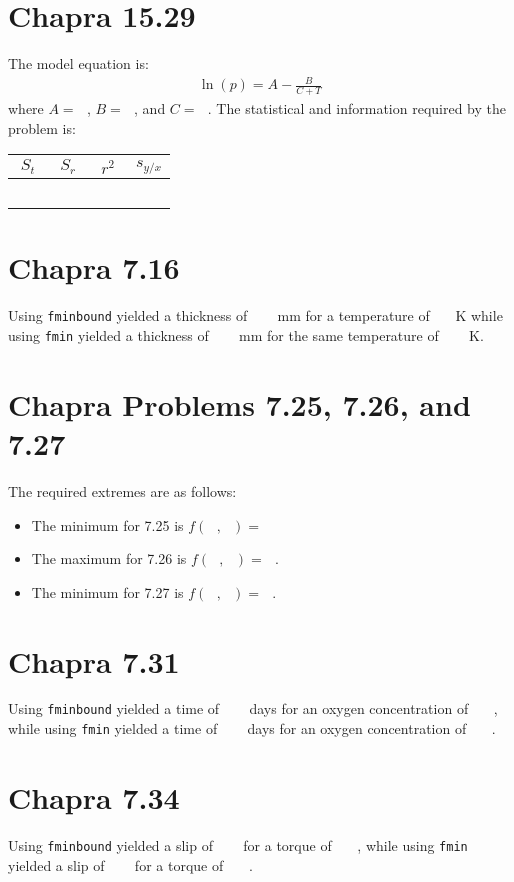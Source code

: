 \documentclass{article}
\begin{document}
\section{Chapra 15.29}
The model equation is:
\begin{align*}
\ln(p)=A-\frac{B}{C+T}
\end{align*}
where $A=~~~$, $B=~~~$, and $C=~~~$.  The statistical and information required by the problem is:
\begin{center}
\begin{tabular}{c|c|c|c}
$S_t$ & $S_r$ & $r^2$ & $s_{y/x}$\\ \hline
~~~ & ~~~ & ~~~ & ~~~ \\
\end{tabular}
\end{center}

\section{Chapra 7.16}
Using {\tt fminbound} yielded a thickness of ~~~ mm for a temperature of ~~~K while using {\tt fmin} yielded a thickness of ~~~ mm for the same temperature of ~~~ K.

\section{Chapra Problems 7.25, 7.26, and 7.27}
The required extremes are as follows:
\begin{itemize}
\item The minimum for 7.25 is $f(~~~, ~~~)=~~~$
\item The maximum for 7.26 is $f(~~~, ~~~)=~~~$.
\item The minimum for 7.27 is $f(~~~, ~~~)=~~~$.
\end{itemize}

\section{Chapra 7.31}
Using {\tt fminbound} yielded a time of ~~~ days for an oxygen concentration of ~~~, while using {\tt fmin} yielded a time of ~~~ days for an oxygen concentration of ~~~.

\section{Chapra 7.34}
Using {\tt fminbound} yielded a slip of ~~~ for a torque of ~~~, while using {\tt fmin} yielded a slip of ~~~ for a torque of ~~~. 
\end{document}

